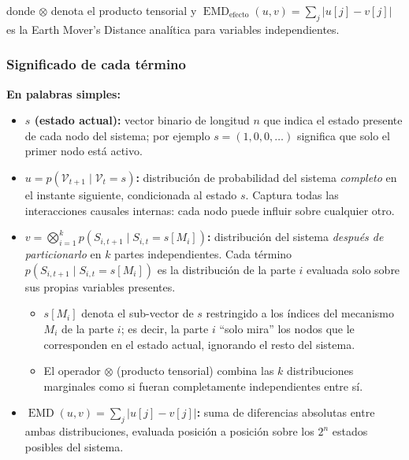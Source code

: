 \documentclass[12pt,letterpaper]{article}
\theoremstyle{definition}
\theoremstyle{remark}
\newcommand{\V}{\mathcal{V}}
\newcommand{\EMD}{\operatorname{EMD}}
\newcommand{\tensor}{\otimes}
\begin{document}
donde $\tensor$ denota el producto tensorial y
$\EMD_{\mathrm{efecto}}(u, v) = \sum_j |u[j] - v[j]|$ es la
Earth Mover's Distance analítica para variables independientes.

\subsubsection*{Significado de cada término}

\begin{orangeBox}
\textbf{En palabras simples:}

\begin{itemize}
  \item \textbf{$s$ (estado actual):} vector binario de longitud $n$ que indica el estado
    presente de cada nodo del sistema; por ejemplo $s = (1, 0, 0, \ldots)$ significa que
    solo el primer nodo está activo.

  \item \textbf{$u = p(\V_{t+1} \mid \V_t = s)$:} distribución de probabilidad del
    sistema \emph{completo} en el instante siguiente, condicionada al estado $s$.
    Captura todas las interacciones causales internas: cada nodo puede influir sobre
    cualquier otro.

  \item \textbf{$v = \bigotimes_{i=1}^{k} p(S_{i,t+1} \mid S_{i,t} = s[M_i])$:}
    distribución del sistema \emph{después de particionarlo} en $k$ partes independientes.
    Cada término $p(S_{i,t+1} \mid S_{i,t} = s[M_i])$ es la distribución de la parte
    $i$ evaluada solo sobre sus propias variables presentes.
    \begin{itemize}
      \item $s[M_i]$ denota el sub-vector de $s$ restringido a los índices del mecanismo
        $M_i$ de la parte $i$; es decir, la parte $i$ ``solo mira'' los nodos que le
        corresponden en el estado actual, ignorando el resto del sistema.
      \item El operador $\otimes$ (producto tensorial) combina las $k$ distribuciones
        marginales como si fueran completamente independientes entre sí.
    \end{itemize}

  \item \textbf{$\EMD(u,v) = \sum_j |u[j] - v[j]|$:} suma de diferencias absolutas
    entre ambas distribuciones, evaluada posición a posición sobre los $2^n$ estados
    posibles del sistema.
\end{itemize}


\end{orangeBox}
\end{document}
